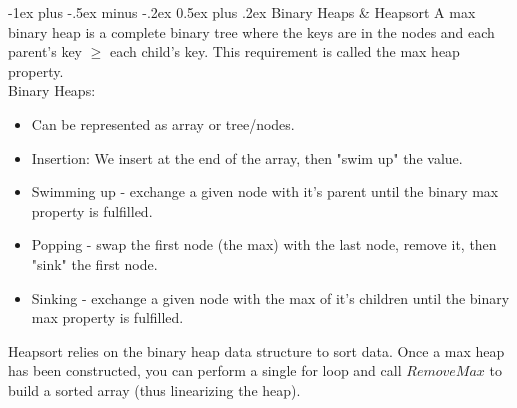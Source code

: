\documentclass[letterpaper, 8pt]{extarticle}
\makeatletter
\renewcommand{\section}{\@startsection{section}{1}{0mm}%
                                {-1ex plus -.5ex minus -.2ex}%
                                {0.5ex plus .2ex}%
                                {\normalfont\normalsize\bfseries}}
\makeatother
\begin{document}
\begin{multicols*}{5}
    \section{Binary Heaps \& Heapsort}
    A max binary heap is a complete binary tree where the keys are in the nodes and each parent's key $\geq$ each child's key. This requirement is called the max heap property.
    \\
    Binary Heaps:
    \begin{itemize}
        \item Can be represented as array or tree/nodes.
        \item Insertion: We insert at the end of the array, then "swim up" the value.
        \item Swimming up - exchange a given node with it's parent until the binary max property is fulfilled.
        \item Popping - swap the first node (the max) with the last node, remove it, then "sink" the first node.
        \item Sinking - exchange a given node with the max of it's children until the binary max property is fulfilled.
    \end{itemize}

    Heapsort relies on the binary heap data structure to sort data. Once a max heap has been constructed, you can perform a single for loop and call $RemoveMax$ to build a sorted array (thus linearizing the heap).

\end{multicols*}
\end{document}
